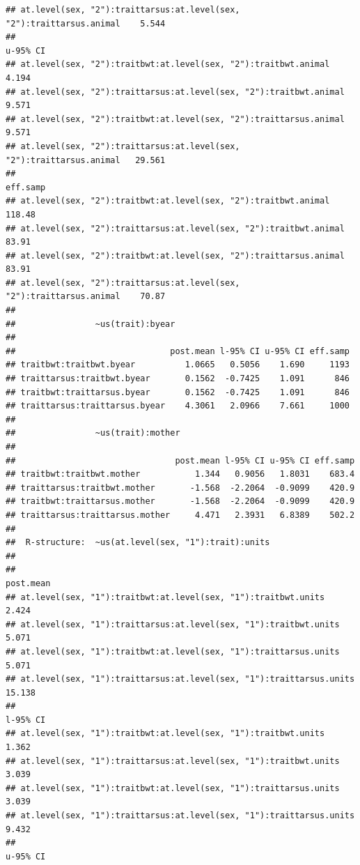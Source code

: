 \documentclass[
  12pt,
]{book}
\begin{document}
\begin{verbatim}
## at.level(sex, "2"):traittarsus:at.level(sex, "2"):traittarsus.animal    5.544
##                                                                      u-95% CI
## at.level(sex, "2"):traitbwt:at.level(sex, "2"):traitbwt.animal          4.194
## at.level(sex, "2"):traittarsus:at.level(sex, "2"):traitbwt.animal       9.571
## at.level(sex, "2"):traitbwt:at.level(sex, "2"):traittarsus.animal       9.571
## at.level(sex, "2"):traittarsus:at.level(sex, "2"):traittarsus.animal   29.561
##                                                                      eff.samp
## at.level(sex, "2"):traitbwt:at.level(sex, "2"):traitbwt.animal         118.48
## at.level(sex, "2"):traittarsus:at.level(sex, "2"):traitbwt.animal       83.91
## at.level(sex, "2"):traitbwt:at.level(sex, "2"):traittarsus.animal       83.91
## at.level(sex, "2"):traittarsus:at.level(sex, "2"):traittarsus.animal    70.87
## 
##                ~us(trait):byear
## 
##                               post.mean l-95% CI u-95% CI eff.samp
## traitbwt:traitbwt.byear          1.0665   0.5056    1.690     1193
## traittarsus:traitbwt.byear       0.1562  -0.7425    1.091      846
## traitbwt:traittarsus.byear       0.1562  -0.7425    1.091      846
## traittarsus:traittarsus.byear    4.3061   2.0966    7.661     1000
## 
##                ~us(trait):mother
## 
##                                post.mean l-95% CI u-95% CI eff.samp
## traitbwt:traitbwt.mother           1.344   0.9056   1.8031    683.4
## traittarsus:traitbwt.mother       -1.568  -2.2064  -0.9099    420.9
## traitbwt:traittarsus.mother       -1.568  -2.2064  -0.9099    420.9
## traittarsus:traittarsus.mother     4.471   2.3931   6.8389    502.2
## 
##  R-structure:  ~us(at.level(sex, "1"):trait):units
## 
##                                                                     post.mean
## at.level(sex, "1"):traitbwt:at.level(sex, "1"):traitbwt.units           2.424
## at.level(sex, "1"):traittarsus:at.level(sex, "1"):traitbwt.units        5.071
## at.level(sex, "1"):traitbwt:at.level(sex, "1"):traittarsus.units        5.071
## at.level(sex, "1"):traittarsus:at.level(sex, "1"):traittarsus.units    15.138
##                                                                     l-95% CI
## at.level(sex, "1"):traitbwt:at.level(sex, "1"):traitbwt.units          1.362
## at.level(sex, "1"):traittarsus:at.level(sex, "1"):traitbwt.units       3.039
## at.level(sex, "1"):traitbwt:at.level(sex, "1"):traittarsus.units       3.039
## at.level(sex, "1"):traittarsus:at.level(sex, "1"):traittarsus.units    9.432
##                                                                     u-95% CI

\end{verbatim}
\end{document}
